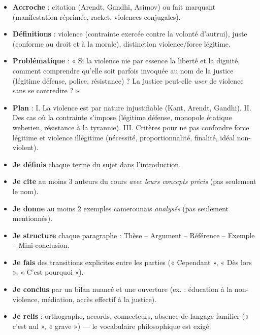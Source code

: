 \documentclass[11pt]{article}
\begin{document}
\begin{corrige}
\begin{itemize}
\item \textbf{Accroche} : citation (Arendt, Gandhi, Asimov) ou fait marquant (manifestation réprimée, racket, violences conjugales).
\item \textbf{Définitions} : violence (contrainte exercée contre la volonté d'autrui), juste (conforme au droit et à la morale), distinction violence/force légitime.
\item \textbf{Problématique} : « Si la violence nie par essence la liberté et la dignité, comment comprendre qu'elle soit parfois invoquée au nom de la justice (légitime défense, police, résistance) ? La justice peut-elle \emph{user} de violence sans se contredire ? »
\item \textbf{Plan} : I. La violence est par nature injustifiable (Kant, Arendt, Gandhi). II. Des cas où la contrainte s'impose (légitime défense, monopole étatique weberien, résistance à la tyrannie). III. Critères pour ne pas confondre force légitime et violence illégitime (nécessité, proportionnalité, finalité, idéal non-violent).
\end{itemize}
\end{corrige}

\begin{aretenir}
\begin{itemize}
\item \textbf{Je définis} chaque terme du sujet dans l'introduction.
\item \textbf{Je cite} au moins 3 auteurs du cours \emph{avec leurs concepts précis} (pas seulement le nom).
\item \textbf{Je donne} au moins 2 exemples camerounais \emph{analysés} (pas seulement mentionnés).
\item \textbf{Je structure} chaque paragraphe : Thèse – Argument – Référence – Exemple – Mini-conclusion.
\item \textbf{Je fais} des transitions explicites entre les parties (« Cependant », « Dès lors », « C'est pourquoi »).
\item \textbf{Je conclus} par un bilan nuancé et une ouverture (ex. : éducation à la non-violence, médiation, accès effectif à la justice).
\item \textbf{Je relis} : orthographe, accords, connecteurs, absence de langage familier (« c'est nul », « grave ») — le vocabulaire philosophique est exigé.
\end{itemize}
\end{aretenir}
\end{document}

